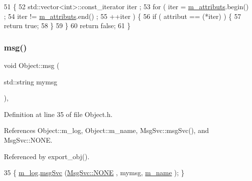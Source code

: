 \begin{DoxyCode}
51   \{
52     std::vector<int>::const\_iterator iter ;
53     \textcolor{keywordflow}{for} ( iter  = \hyperlink{classAttrib_ac4bd58a0cc6b38a3b711d609a3d3aacc}{m\_attributs}.begin() ;
54           iter != \hyperlink{classAttrib_ac4bd58a0cc6b38a3b711d609a3d3aacc}{m\_attributs}.end()   ;
55           ++iter ) \{
56       \textcolor{keywordflow}{if} ( attribut == (*iter) ) \{
57         \textcolor{keywordflow}{return} \textcolor{keyword}{true};
58       \}
59     \}
60     \textcolor{keywordflow}{return} \textcolor{keyword}{false};
61   \}
\end{DoxyCode}
\mbox{\label{classObject_a58b2d0618c2d08cf2383012611528d97}} 
\subsubsection{\texorpdfstring{msg()}{msg()}\hspace{0.1cm}{\footnotesize\ttfamily [1/2]}}
{\footnotesize\ttfamily void Object\+::msg (\begin{DoxyParamCaption}\item[{std\+::string}]{mymsg }\end{DoxyParamCaption})\hspace{0.3cm}{\ttfamily [inline]}, {\ttfamily [inherited]}}



Definition at line 35 of file Object.\+h.



References Object\+::m\+\_\+log, Object\+::m\+\_\+name, Msg\+Svc\+::msg\+Svc(), and Msg\+Svc\+::\+N\+O\+NE.



Referenced by export\+\_\+obj().


\begin{DoxyCode}
35 \{ \hyperlink{classObject_a0d269813dd7ac1f24bc143031e2963f2}{m\_log}.\hyperlink{classMsgSvc_ad25f18047920cc59a314e5098259711c}{msgSvc} (\hyperlink{classMsgSvc_ae671eb7301996cd049d2da8a65925926a9be9ae32fed8e1e6eba4a58692210fbd}{MsgSvc::NONE}    , mymsg, \hyperlink{classObject_a8b83c95c705d2c3ba0d081fe1710f48d}{m\_name} ); \}
\end{DoxyCode}
\mbox{\label{classObject_ac5d59299273cee27aacf7de00d2e7034}} 
